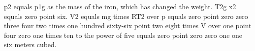 p2 equals p1g as the mass of the iron, which has changed the weight. T2g x2 equals zero point six. V2 equals mg times RT2 over p equals zero point zero zero three four two times one hundred sixty-six point two eight times V over one point four zero one times ten to the power of five equals zero point zero zero one one six meters cubed.